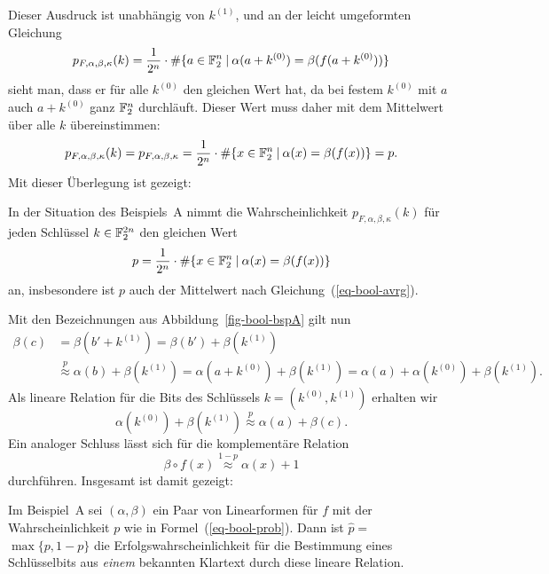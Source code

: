 \begin{refsegment}
Dieser Ausdruck ist unabhängig von $k^{(1)}$, und an der leicht umgeformten
Gleichung
\[
     p_{F,\alpha,\beta,\kappa}(k) = \frac{1}{2^n} \cdot
      \#\{a \in \mathbb{F}_2^n \:|\: \alpha(a + k^{(0)}) = \beta(f(a + k^{(0)})) \}
\]
sieht man, dass er für alle $k^{(0)}$ den gleichen Wert hat, da bei festem
$k^{(0)}$ mit $a$ auch $a + k^{(0)}$ ganz $\mathbb{F}_2^n$ durchläuft. Dieser Wert
muss daher mit dem Mittelwert über alle $k$ übereinstimmen:
\[
     p_{F,\alpha,\beta,\kappa}(k) = p_{F,\alpha,\beta,\kappa} = \frac{1}{2^n} \cdot
      \#\{x \in \mathbb{F}_2^n \:|\: \alpha(x) = \beta(f(x)) \} = p.
\]
Mit dieser Überlegung ist gezeigt:

\begin{satz}
    In der Situation des Beispiels~A nimmt die Wahrscheinlichkeit $p_{F,\alpha,\beta,\kappa}(k)$
    für jeden Schlüssel $k \in \mathbb{F}_2^{2n}$ den gleichen Wert
\[
     p = \frac{1}{2^n} \cdot \#\{x \in \mathbb{F}_2^n \:|\: \alpha(x) = \beta(f(x)) \}
\]
   an, insbesondere ist $p$ auch der Mittelwert nach Gleichung~(\ref{eq-bool-avrg}).
\end{satz}

Mit den Bezeichnungen aus Abbildung~\ref{fig-bool-bspA} gilt nun
\begin{align*}
   \beta(c) & = \beta(b' + k^{(1)}) = \beta(b') + \beta(k^{(1)}) \\
            & \stackrel{p}{\approx} \alpha(b) + \beta(k^{(1)})
                   = \alpha(a + k^{(0)}) + \beta(k^{(1)})
                        = \alpha(a) + \alpha(k^{(0)}) + \beta(k^{(1)}).
\end{align*}
Als lineare Relation
für die Bits des Schlüssels $k = (k^{(0)},k^{(1)})$ erhalten wir
\[
   \alpha(k^{(0)}) + \beta(k^{(1)}) \stackrel{p}{\approx} \alpha(a) + \beta(c).
\]
Ein analoger Schluss lässt sich für die komplementäre Relation
\[
   \beta\circ f(x) \stackrel{1-p}{\approx} \alpha(x) + 1
\]
durchführen. Insgesamt ist damit gezeigt:

\begin{satz}
  Im Beispiel~A sei $(\alpha,\beta)$ ein Paar von Linearformen für $f$
  mit der Wahrscheinlichkeit $p$ wie in Formel~(\ref{eq-bool-prob}).
  Dann ist $\hat{p} =$ \mbox{$\max\{p, 1-p\}$} die Erfolgswahrscheinlichkeit für
  die Bestimmung eines Schlüsselbits aus {\em einem} bekannten
  Klartext
  durch diese lineare Relation.
\end{satz}


\end{refsegment}
